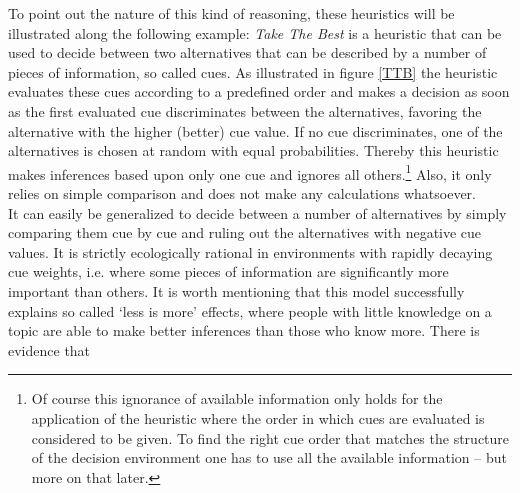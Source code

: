To point out the nature of this kind of reasoning, these heuristics will be illustrated along the following example: \emph{Take The Best} \citep{Gigerenzer1996} is a heuristic that can be used to decide between two alternatives that can be described by a number of pieces of information, so called cues. As illustrated in figure \ref{TTB} the heuristic evaluates these cues according to a predefined order and makes a decision as soon as the first evaluated cue discriminates between the alternatives, favoring the alternative with the higher (better) cue value. If no cue discriminates, one of the alternatives is chosen at random with equal probabilities. Thereby this heuristic makes inferences based upon only one cue and ignores all others.\footnote{Of course this ignorance of available information only holds for the application of the heuristic where the order in which cues are evaluated is considered to be given. To find the right cue order that matches the structure of the decision environment one has to use all the available information -- but more on that later.} Also, it only relies on simple comparison and does not make any calculations whatsoever.\\
It can easily be generalized to decide between a number of alternatives by simply comparing them cue by cue and ruling out the alternatives with negative cue values.
It is strictly ecologically rational in environments with rapidly decaying cue weights, i.e. where some pieces of information are significantly more important than others. It is worth mentioning that this model successfully explains so called `less is more' effects, where people with little knowledge on a topic are able to make better inferences than those who know more. There is evidence \citep{Garcia-Retamero2009,Pachur2013} that
